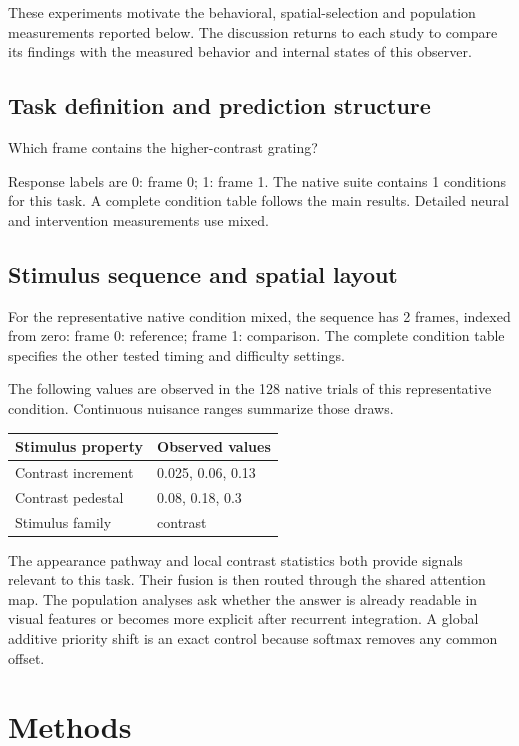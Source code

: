 \documentclass[11pt]{article}
\begin{document}
These experiments motivate the behavioral, spatial-selection and population measurements reported below. The discussion returns to each study to compare its findings with the measured behavior and internal states of this observer.
\subsection{Task definition and prediction structure}
Which frame contains the higher-contrast grating?

Response labels are 0: frame 0; 1: frame 1. The native suite contains 1 conditions for this task. A complete condition table follows the main results. Detailed neural and intervention measurements use mixed.

\subsection{Stimulus sequence and spatial layout}
For the representative native condition mixed, the sequence has 2 frames, indexed from zero: frame 0: reference; frame 1: comparison. The complete condition table specifies the other tested timing and difficulty settings.

The following values are observed in the 128 native trials of this representative condition. Continuous nuisance ranges summarize those draws.
\begin{center}\small\begin{tabular}{p{}p{}}\toprule Stimulus property & Observed values\\\midrule
Contrast increment & 0.025, 0.06, 0.13\\
Contrast pedestal & 0.08, 0.18, 0.3\\
Stimulus family & contrast\\
\bottomrule\end{tabular}\normalsize\end{center}
The appearance pathway and local contrast statistics both provide signals relevant to this task. Their fusion is then routed through the shared attention map. The population analyses ask whether the answer is already readable in visual features or becomes more explicit after recurrent integration. A global additive priority shift is an exact control because softmax removes any common offset.


\section{Methods}
\end{document}
